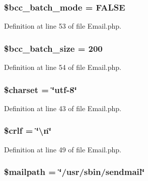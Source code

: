 \subsubsection[{\$bcc\-\_\-batch\-\_\-mode}]{\setlength{\rightskip}{0pt plus 5cm}\$bcc\-\_\-batch\-\_\-mode = F\-A\-L\-S\-E}\label{class_c_i___email_ac67d3df67b03960980abe368f03e088e}


Definition at line 53 of file Email.\-php.

\subsubsection[{\$bcc\-\_\-batch\-\_\-size}]{\setlength{\rightskip}{0pt plus 5cm}\$bcc\-\_\-batch\-\_\-size = 200}\label{class_c_i___email_abdb56da29fb9feee14d2374170c3cb5c}


Definition at line 54 of file Email.\-php.

\subsubsection[{\$charset}]{\setlength{\rightskip}{0pt plus 5cm}\$charset = \char`\"{}utf-\/8\char`\"{}}\label{class_c_i___email_af10158dd74b75f1d337e83102d6b82ce}


Definition at line 43 of file Email.\-php.

\subsubsection[{\$crlf}]{\setlength{\rightskip}{0pt plus 5cm}\$crlf = \char`\"{}\textbackslash{}n\char`\"{}}\label{class_c_i___email_a85554ab78e9a915b4299dd3f1d5c2866}


Definition at line 49 of file Email.\-php.

\subsubsection[{\$mailpath}]{\setlength{\rightskip}{0pt plus 5cm}\$mailpath = \char`\"{}/usr/sbin/sendmail\char`\"{}}\label{class_c_i___email_a23dd98b1852b9e73c20292b2cc96b20f}


